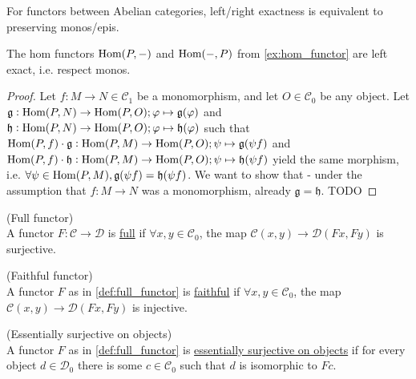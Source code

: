 \begin{lemma}
For functors between Abelian categories, left/right exactness is equivalent to preserving monos/epis.
\end{lemma}

\begin{lemma}\label{la:hom_functor_left_exact}
The hom functors $\textup{Hom}(P,-)$ and $\textup{Hom}(-,P)$ from \ref{ex:hom_functor} are left exact, i.e. respect monos.
\begin{proof}
Let $f : M \rightarrow N \in \mathcal{C}_{1}$ be a monomorphism, and let $O \in \mathcal{C}_{0}$ be any object.
Let $\mathfrak{g} : \textup{Hom}(P,N) \rightarrow \textup{Hom}(P,O); \varphi \mapsto \mathfrak{g}(\varphi)$
and $\mathfrak{h} : \textup{Hom}(P,N) \rightarrow \textup{Hom}(P,O); \varphi \mapsto \mathfrak{h}(\varphi)$
such that $\textup{Hom}(P,f) \cdot \mathfrak{g} : \textup{Hom}(P,M) \rightarrow \textup{Hom}(P,O); \psi \mapsto \mathfrak{g}(\psi f)$
and  $\textup{Hom}(P,f) \cdot \mathfrak{h} : \textup{Hom}(P,M) \rightarrow \textup{Hom}(P,O); \psi \mapsto \mathfrak{h}(\psi f)$
yield the same morphism, i.e. $\forall \psi \in \textup{Hom}(P,M), \mathfrak{g}(\psi f) = \mathfrak{h}(\psi f)$.
We want to show that - under the assumption that $f : M \rightarrow N$ was a monomorphism, already $\mathfrak{g} = \mathfrak{h}$.
TODO
\end{proof}
\end{lemma}

\begin{definition}{(Full functor)}\label{def:full_functor}\\
A functor $F : \mathcal{C} \rightarrow \mathcal{D}$ is \ul{full} if
$\forall x, y \in \mathcal{C}_{0}$, the map $\mathcal{C}(x, y) \rightarrow \mathcal{D}(Fx, Fy)$ is surjective.
\end{definition}

\begin{definition}{(Faithful functor)}\label{def:faithful_functor}\phantom{}\\
A functor $F$ as in \ref{def:full_functor} is \ul{faithful} if
$\forall x, y \in \mathcal{C}_{0}$, the map $\mathcal{C}(x, y) \rightarrow \mathcal{D}(Fx, Fy)$ is injective.
\end{definition}

\begin{definition}{(Essentially surjective on objects)}\label{def:ess_surj_o_o}\phantom{}\\
A functor $F$ as in \ref{def:full_functor} is \ul{essentially surjective on objects} if for every object $d \in \mathcal{D}_{0}$ there
is some $c \in \mathcal{C}_{0}$ such that $d$ is isomorphic to $Fc$.
\end{definition}

